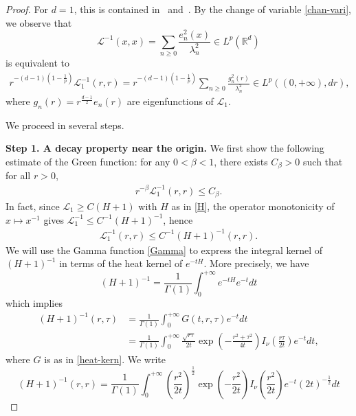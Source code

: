 \documentclass[%
11pt,  reqno]{amsart}
\theoremstyle{remarkstyle}
\newcommand{\1}{\hspace{0.2mm}\text{I}\hspace{0.2mm}}
\newcommand{\R}{\mathbb{R}}
\renewcommand{\L}{\mathcal{L}}
\newcommand{\ld}{\lambda}
\numberwithin{equation}{section}
\numberwithin{theorem}{section}
\begin{document}
	
	\begin{proof}
		For $d=1$, this is contained in~\cite[Lemma~3.2]{LNR18} and~\cite[Lemma~3.3]{DR23}. By the change of variable \eqref{chan-vari}, we observe that
		$$
		\L^{-1}(x,x) = \sum_{n\ge 0} \frac{e^2_n(x)}{\ld^2_n} \in L^p(\R^d) 
		$$
		is equivalent to 
		\begin{align} \label{GreenEst-proof}
			r^{-(d-1)\left(1-\frac{1}{p}\right)} \L_1^{-1}(r,r) = r^{-(d-1)\left(1-\frac{1}{p}\right)} \sum_{n\ge 0} \frac{g^2_n(r)}{\ld^2_n} \in L^p((0,+\infty),dr),
		\end{align}
		where $g_n(r) = r^{\frac{d-1}{2}} e_n(r)$ are eigenfunctions of $\L_1$. 
		
		We proceed in several steps.
		
		{\bf Step 1. A decay property near the origin.} We first show the following estimate of the Green function: for any $0<\beta<1$, there exists $C_\beta>0$ such that for all $r>0$,
		\begin{align} \label{beta}
			r^{-\beta} \L_1^{-1}(r,r) \leq C_\beta. 
		\end{align}
		In fact, since $\L_1 \geq C(H+1)$ with $H$ as in \eqref{H}, the operator monotonicity of $x\mapsto x^{-1}$ gives $\L_1^{-1}\leq C^{-1} (H+1)^{-1}$, hence
		\begin{align}\label{boun-H1-L}
			\L_1^{-1}(r,r) \leq C^{-1} (H+1)^{-1}(r,r).
		\end{align}
		We will use the Gamma function \eqref{Gamma} to express the integral kernel of $(H+1)^{-1}$ in terms of the heat kernel of $e^{-tH}$. More precisely,  we have
		\[
		(H+1)^{-1} = \frac{1}{\Gamma(1)}\int_0^{+\infty} e^{-tH} e^{-t}dt
		\]
		which implies
		\begin{align*}
			(H+1)^{-1}(r,\tau) &= \frac{1}{\Gamma(1)}\int_0^{+\infty} G(t,r,\tau) e^{-t}dt \\
			&= \frac{1}{\Gamma(1)}\int_0^{+\infty} \frac{\sqrt{r\tau}}{2t} \exp\left(-\frac{r^2+\tau^2}{4t}\right) I_\nu\left(\frac{r\tau}{2t}\right) e^{-t}dt,
		\end{align*}
		where $G$ is as in \eqref{heat-kern}. We write
		\[
		(H+1)^{-1}(r,r) = \frac{1}{\Gamma(1)}\int_0^{+\infty} \left(\frac{r^2}{2t}\right)^{\frac{1}{2}} \exp\left(-\frac{r^2}{2t}\right) I_\nu\left(\frac{r^2}{2t}\right) e^{-t} (2t)^{-\frac{1}{2}}dt 
\]
\end{proof}
\end{document}
